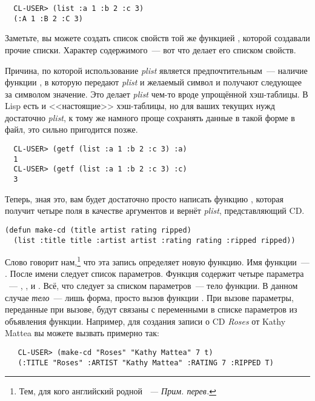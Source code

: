 \begin{verbatim}
  CL-USER> (list :a 1 :b 2 :c 3)
  (:A 1 :B 2 :C 3)
\end{verbatim}

Заметьте, вы можете создать список свойств той же функцией , которой создавали
прочие списки. Характер содержимого~--- вот что делает его списком свойств.

Причина, по которой использование \textit{plist} является предпочтительным~--- наличие
функции , в которую передают \textit{plist} и желаемый символ и получают
следующее за символом значение. Это делает \textit{plist} чем-то вроде упрощённой
хэш-таблицы. В Lisp есть и <<настоящие>> хэш-таблицы, но для ваших текущих нужд достаточно
\textit{plist}, к тому же намного проще сохранять данные в такой форме в файл, это сильно
пригодится позже.

\begin{verbatim}
  CL-USER> (getf (list :a 1 :b 2 :c 3) :a)
  1
  CL-USER> (getf (list :a 1 :b 2 :c 3) :c)
  3
\end{verbatim}

Теперь, зная это, вам будет достаточно просто написать функцию , которая
получит четыре поля в качестве аргументов и вернёт \textit{plist}, представляющий CD.

\begin{lstlisting}
(defun make-cd (title artist rating ripped)
  (list :title title :artist artist :rating rating :ripped ripped))
\end{lstlisting}

Слово  говорит нам,\footnote{Тем, для кого английский родной \textit{~---
Прим. перев.}} что эта запись определяет новую функцию. Имя функции~---
. После имени следует список параметров. Функция содержит четыре параметра
~--- , ,  и . Всё, что следует за
списком параметров~--- тело функции. В данном случае \textit{тело}~--- лишь форма, просто
вызов функции . При вызове  параметры, переданные при вызове,
будут связаны с переменными в списке параметров из объявления функции. Например, для
создания записи о CD \textit{Roses} от Kathy Mattea вы можете вызвать 
примерно так:

\begin{verbatim}
   CL-USER> (make-cd "Roses" "Kathy Mattea" 7 t)
   (:TITLE "Roses" :ARTIST "Kathy Mattea" :RATING 7 :RIPPED T) 
\end{verbatim}

